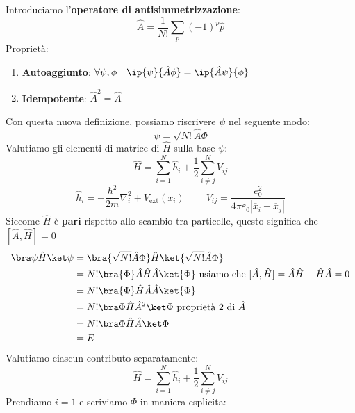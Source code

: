 Introduciamo l'\textbf{operatore di antisimmetrizzazione}:
\begin{equation*}
    \hat A = \frac{1}{N!}\sum_p(-1)^p\hat p
\end{equation*}
\noindent Proprietà:
\begin{enumerate}
    \item \textbf{Autoaggiunto}: $\forall\psi,\phi \ \ \ \ip{\psi}{\hat A \phi}=\ip{\hat A \psi}{\phi}$
    \item \textbf{Idempotente}: $\hat A ^2 = \hat A$
\end{enumerate}
Con questa nuova definizione, possiamo riscrivere $\psi$ nel seguente modo:
\begin{equation*}
    \psi = \sqrt{N!}\hat A \Phi
\end{equation*}
Valutiamo gli elementi di matrice di $\hat H$ sulla base $\psi$:
\begin{equation*}
    \hat H = \sum_{i=1}^N \hat h_i + \frac 12 \sum_{i\neq j}^NV_{ij} 
\end{equation*}
\begin{equation*}
    \hat h_i = -\frac{\hbar^2}{2m}\nabla_i^2+V_{\text{ext}}(\overline{x}_i) \ \ \ \ \ \ \ \ \ \ V_{ij}=\frac{e_0^2}{4\pi\varepsilon_0|\overline{x}_i-\overline{x}_j|}
\end{equation*}
Siccome $\hat H$ è \textbf{pari} rispetto allo scambio tra particelle, questo significa che $[\hat A, \hat H]=0$
\begin{equation*}
    \begin{aligned}
        \bra\psi \hat H\ket\psi
        & =\bra{\sqrt{N!}\hat A \Phi}\hat H\ket{\sqrt{N!}\hat A \Phi} \\
        & =N!\bra{\Phi} \hat A \hat H \hat A \ket{\Phi} \text{ usiamo che }[\hat A, \hat H]=\hat A\hat H - \hat H \hat A = 0\\
        & =N!\bra{\Phi} \hat H \hat A \hat A \ket{\Phi} \\
        & =N!\bra\Phi\hat H \hat A^2 \ket\Phi \text{ proprietà 2 di }\hat A\\
        & =N!\bra\Phi\hat H\hat A\ket\Phi \\
        & = E
    \end{aligned}
\end{equation*}
Valutiamo ciascun contributo separatamente:
\begin{equation*}
    \hat H = \sum_{i=1}^N \hat h_i + \frac 12 \sum_{i\neq j}^NV_{ij} 
\end{equation*}
Prendiamo $i=1$ e scriviamo $\Phi$ in maniera esplicita:
